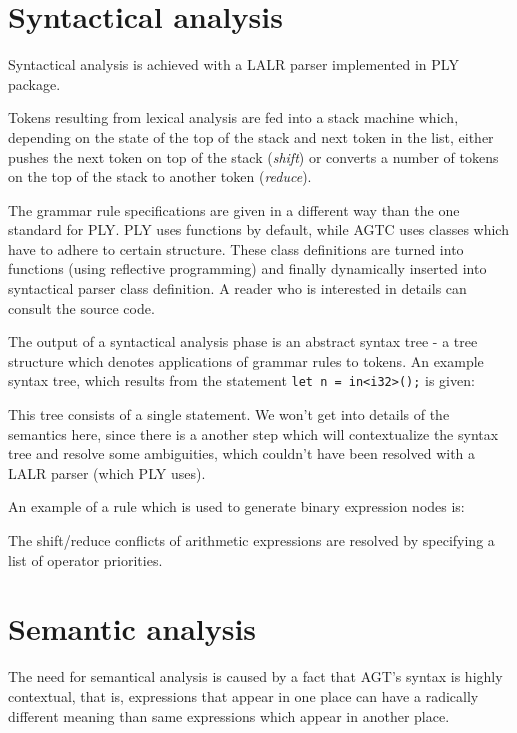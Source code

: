 \documentclass[times, utf8, diplomski]{fer}
\theoremstyle{definition}
\begin{document}
\section{Syntactical analysis}

Syntactical analysis is achieved with a LALR parser implemented in PLY package. 

Tokens resulting from lexical analysis are fed into a stack machine which,
depending on the state of the top of the stack and next token in the list,
either pushes the next token on top of the stack (\textit{shift}) or converts
a number of tokens on the top of the stack to another token (\textit{reduce}).

The grammar rule specifications are given in a different way than the
one standard for PLY. PLY uses functions by default, while AGTC uses
classes which have to adhere to certain structure. These class definitions
are turned into functions (using reflective programming) and finally
dynamically inserted into syntactical parser class definition.
A reader who is interested in details can consult the source code.

The output of a syntactical analysis phase is an abstract syntax tree - a tree structure
which denotes applications of grammar rules to tokens. An example syntax tree, which
results from the statement \texttt{let n = in<i32>();} is given:



This tree consists of a single statement. We won't get into details of the semantics here,
since there is a another step which will contextualize the syntax tree and resolve some ambiguities,
which couldn't have been resolved with a LALR parser (which PLY uses).

An example of a rule which is used to generate binary expression nodes is:



The shift/reduce conflicts of arithmetic expressions are resolved by specifying
a list of operator priorities.

\section{Semantic analysis}

The need for semantical analysis is caused by a fact that AGT's syntax is highly contextual,
that is, expressions that appear in one place can have a radically different meaning
than same expressions which appear in another place.
\end{document}
